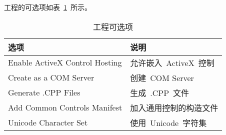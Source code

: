 工程的可选项如表~\ref{tab:setup:option}~所示。
\begin{table}[h]
  \centering
  \caption{工程可选项}\label{tab:setup:option}
\begin{tabular}{|l|l|}
  \hline
  \textbf{选项} & \textbf{说明} \\
  \hline\hline
  Enable ActiveX Control Hosting
  & 允许嵌入~ActiveX~控制 \\
  \hline
  Create as a COM Server & 创建~COM Server \\
  \hline
  Generate .CPP Files & 生成~.CPP~文件 \\
  \hline
  Add Common Controls Manifest
  & 加入通用控制的构造文件 \\
  \hline
  Unicode Character Set & 使用~Unicode~字符集 \\
  \hline
\end{tabular}

\end{table}
